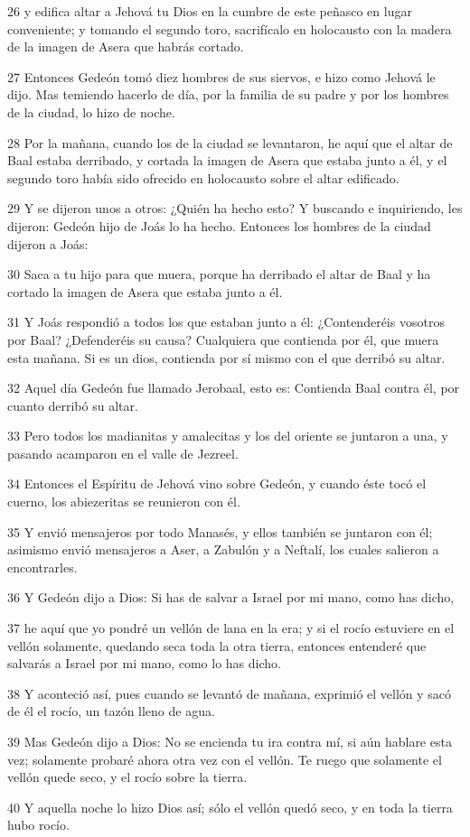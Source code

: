 \par 26 y edifica altar a Jehová tu Dios en la cumbre de este peñasco en lugar conveniente; y tomando el segundo toro, sacrifícalo en holocausto con la madera de la imagen de Asera que habrás cortado.
\par 27 Entonces Gedeón tomó diez hombres de sus siervos, e hizo como Jehová le dijo. Mas temiendo hacerlo de día, por la familia de su padre y por los hombres de la ciudad, lo hizo de noche.
\par 28 Por la mañana, cuando los de la ciudad se levantaron, he aquí que el altar de Baal estaba derribado, y cortada la imagen de Asera que estaba junto a él, y el segundo toro había sido ofrecido en holocausto sobre el altar edificado.
\par 29 Y se dijeron unos a otros: ¿Quién ha hecho esto? Y buscando e inquiriendo, les dijeron: Gedeón hijo de Joás lo ha hecho. Entonces los hombres de la ciudad dijeron a Joás:
\par 30 Saca a tu hijo para que muera, porque ha derribado el altar de Baal y ha cortado la imagen de Asera que estaba junto a él.
\par 31 Y Joás respondió a todos los que estaban junto a él: ¿Contenderéis vosotros por Baal? ¿Defenderéis su causa? Cualquiera que contienda por él, que muera esta mañana. Si es un dios, contienda por sí mismo con el que derribó su altar.
\par 32 Aquel día Gedeón fue llamado Jerobaal, esto es: Contienda Baal contra él, por cuanto derribó su altar.
\par 33 Pero todos los madianitas y amalecitas y los del oriente se juntaron a una, y pasando acamparon en el valle de Jezreel.
\par 34 Entonces el Espíritu de Jehová vino sobre Gedeón, y cuando éste tocó el cuerno, los abiezeritas se reunieron con él.
\par 35 Y envió mensajeros por todo Manasés, y ellos también se juntaron con él; asimismo envió mensajeros a Aser, a Zabulón y a Neftalí, los cuales salieron a encontrarles.
\par 36 Y Gedeón dijo a Dios: Si has de salvar a Israel por mi mano, como has dicho,
\par 37 he aquí que yo pondré un vellón de lana en la era; y si el rocío estuviere en el vellón solamente, quedando seca toda la otra tierra, entonces entenderé que salvarás a Israel por mi mano, como lo has dicho.
\par 38 Y aconteció así, pues cuando se levantó de mañana, exprimió el vellón y sacó de él el rocío, un tazón lleno de agua.
\par 39 Mas Gedeón dijo a Dios: No se encienda tu ira contra mí, si aún hablare esta vez; solamente probaré ahora otra vez con el vellón. Te ruego que solamente el vellón quede seco, y el rocío sobre la tierra.
\par 40 Y aquella noche lo hizo Dios así; sólo el vellón quedó seco, y en toda la tierra hubo rocío.

